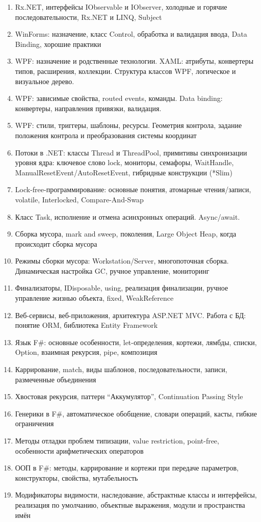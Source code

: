 \documentclass[a5paper]{article}
\begin{document}
\begin{enumerate}
	\item Rx.NET, интерфейсы IObservable и IObserver, холодные и горячие последовательности, Rx.NET и LINQ, Subject
	\item WinForms: назначение, класс Control, обработка и валидация ввода, Data Binding, хорошие практики
	\item WPF: назначение и родственные технологии. XAML: атрибуты, конвертеры типов, расширения, коллекции. Структура классов WPF, логическое и визуальное дерево.
	\item WPF: зависимые свойства, routed events, команды. Data binding: конвертеры, направления привязки, валидация.
	\item WPF: стили, триггеры, шаблоны, ресурсы. Геометрия контрола, задание положения контрола и преобразования системы координат
	\item Потоки в .NET: классы Thread и ThreadPool, примитивы синхронизации уровня ядра: ключевое слово lock, мониторы, семафоры, WaitHandle, ManualResetEvent/AutoResetEvent, гибридные конструкции (*Slim)
	\item Lock-free-программирование: основные понятия, атомарные чтения/записи, volatile, Interlocked, Compare-And-Swap
	\item Класс Task, исполнение и отмена асинхронных операций. Async/await.
	\item Сборка мусора, mark and sweep, поколения, Large Object Heap, когда происходит сборка мусора
	\item Режимы сборки мусора: Workstation/Server, многопоточная сборка. Динамическая настройка GC, ручное управление, мониторинг
	\item Финализаторы, IDisposable, using, реализация финализации, ручное управление жизнью объекта, fixed, WeakReference
	\item Веб-сервисы, веб-приложения, архитектура ASP.NET MVC. Работа с БД: понятие ORM, библиотека Entity Framework
	\item Язык F\#: основные особенности, let-определения, кортежи, лямбды, списки, Option, взаимная рекурсия, pipe, композиция
	\item Каррирование, match, виды шаблонов, последовательности, записи, размеченные объединения
	\item Хвостовая рекурсия, паттерн ``Аккумулятор'', Continuation Passing Style
	\item Генерики в F\#, автоматическое обобщение, словари операций, касты, гибкие ограничения
	\item Методы отладки проблем типизации, value restriction, point-free, особенности арифметических операторов
	\item ООП в F\#: методы, каррирование и кортежи при передаче параметров, конструкторы, свойства, мутабельность
	\item Модификаторы видимости, наследование, абстрактные классы и интерфейсы, реализация по умолчанию, объектные выражения, модули и пространства имён
\end{enumerate}
\end{document}
